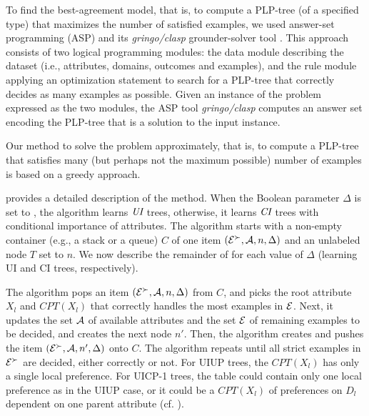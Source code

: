 To find the best-agreement model, that is, to
compute a PLP-tree (of a specified type) that maximizes the number of 
satisfied examples, we used answer-set programming (ASP)
\cite{marek1999stable,niemela1999logic} and its \emph{gringo/clasp}
grounder-solver tool \cite{gebser2011potassco}.
This approach consists of two logical programming modules: 
the data module
describing the dataset (i.e., attributes, domains, outcomes and examples),
and the rule module applying an optimization statement to search for
a PLP-tree that correctly decides as many examples as possible.
Given an instance of the  problem expressed as the two modules,
the ASP tool \emph{gringo/clasp} computes an answer set encoding the PLP-tree
that is a solution to the input instance.

Our method to solve the  problem approximately, that is, to 
compute a PLP-tree that satisfies many (but perhaps not the maximum
possible) number of examples is based on a greedy approach.

 provides a detailed description of the method. When
the Boolean parameter $\Delta$ is set to , the algorithm learns $\textit{UI}$ 
trees, otherwise, it learns $\textit{CI}$ trees with conditional importance of attributes. 
The algorithm starts with a non-empty container (e.g., a stack or a queue) $C$
of one item $(\mathcal{E}^\succ,\mathcal{A},n,\Delta)$ and an unlabeled node $T$ set to $n$.
We now describe the remainder of  for each value of
$\Delta$ (learning UI and CI trees, respectively).

\smallskip \noindent {}
The algorithm pops an item $(\mathcal{E}^\succ,\mathcal{A},n,\Delta)$ from $C$, and
picks the root attribute $X_l$ and
$CPT(X_l)$ that correctly handles the most examples in $\mathcal{E}$.
Next, it updates the set $\mathcal{A}$ of available attributes and the
set $\mathcal{E}$ of remaining examples to be decided, and creates 
the next node $n'$.  Then, the algorithm creates and pushes the item
$(\mathcal{E}^\succ,\mathcal{A},n',\Delta)$ onto $C$.
The algorithm repeats until all strict
examples in $\mathcal{E}^\succ$ are decided, either correctly or not.
For UIUP trees, the $CPT(X_l)$ has only a single local preference.
For UICP-1 trees, the table could contain only one local preference
as in the UIUP case, or it could be a $CPT(X_l)$ of preferences on
$D_l$ dependent on one parent attribute (cf. ).

